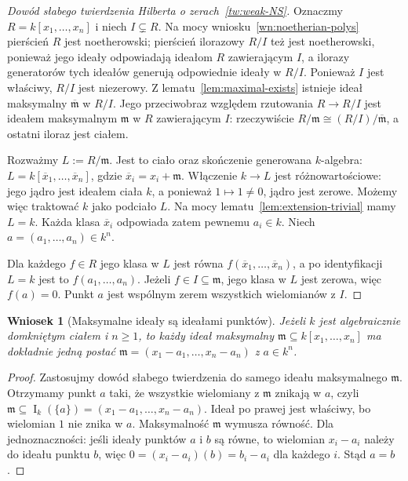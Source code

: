 \documentclass[11pt,a4paper,openany]{report}
\numberwithin{equation}{section}
\theoremstyle{plain}
\newtheorem{wniosek}[twierdzenie]{Wniosek}
\theoremstyle{definition}
\theoremstyle{remark}
\newcommand{\I}{\operatorname I}
\begin{document}
\begin{proof}[Dowód słabego twierdzenia Hilberta o zerach~\ref{tw:weak-NS}]
Oznaczmy $R=k[x_1,\dots,x_n]$ i niech $I\subsetneq R$.
Na mocy wniosku~\ref{wn:noetherian-polys} pierścień $R$
jest noetherowski; pierścień ilorazowy $R/I$ też jest
noetherowski, ponieważ jego ideały odpowiadają ideałom $R$
zawierającym $I$, a ilorazy generatorów tych ideałów generują
odpowiednie ideały w $R/I$.
Ponieważ $I$ jest właściwy, $R/I$ jest niezerowy.
Z lematu~\ref{lem:maximal-exists} istnieje ideał maksymalny
$\overline{\mathfrak m}$ w $R/I$.
Jego przeciwobraz względem rzutowania $R\to R/I$
jest ideałem maksymalnym $\mathfrak m$ w $R$ zawierającym $I$:
rzeczywiście $R/\mathfrak m\cong(R/I)/\overline{\mathfrak m}$,
a ostatni iloraz jest ciałem.

Rozważmy $L:=R/\mathfrak m$.
Jest to ciało oraz skończenie generowana $k$-algebra:
$L=k[\overline x_1,\dots,\overline x_n]$,
gdzie $\overline x_i=x_i+\mathfrak m$.
Włączenie $k\to L$ jest różnowartościowe: jego jądro jest
ideałem ciała $k$, a ponieważ $1\mapsto1\ne0$,
jądro jest zerowe. Możemy więc traktować $k$ jako podciało $L$.
Na mocy lematu~\ref{lem:extension-trivial} mamy $L=k$.
Każda klasa $\overline x_i$ odpowiada zatem pewnemu
$a_i\in k$. Niech $a=(a_1,\dots,a_n)\in k^n$.

Dla każdego $f\in R$ jego klasa w $L$ jest równa
$f(\overline x_1,\dots,\overline x_n)$, a po identyfikacji
$L=k$ jest to $f(a_1,\dots,a_n)$.
Jeżeli $f\in I\subseteq\mathfrak m$, jego klasa w $L$
jest zerowa, więc $f(a)=0$.
Punkt $a$ jest wspólnym zerem wszystkich wielomianów z $I$.
\end{proof}

\begin{wniosek}[Maksymalne ideały są ideałami punktów]
\label{wn:maximal-point}
Jeżeli $k$ jest algebraicznie domkniętym ciałem i $n\ge1$,
to każdy ideał maksymalny $\mathfrak m\subseteq k[x_1,\dots,x_n]$
ma dokładnie jedną postać
$\mathfrak m=(x_1-a_1,\dots,x_n-a_n)$ z $a\in k^n$.
\end{wniosek}
\begin{proof}
Zastosujmy dowód słabego twierdzenia do samego ideału
maksymalnego $\mathfrak m$.
Otrzymamy punkt $a$ taki, że wszystkie wielomiany z
$\mathfrak m$ znikają w $a$, czyli
$\mathfrak m\subseteq\I_k(\{a\})=(x_1-a_1,\dots,x_n-a_n)$.
Ideał po prawej jest właściwy, bo wielomian $1$ nie znika w $a$.
Maksymalność $\mathfrak m$ wymusza równość.
Dla jednoznaczności: jeśli ideały punktów $a$ i $b$ są równe,
to wielomian $x_i-a_i$ należy do ideału punktu $b$,
więc $0=(x_i-a_i)(b)=b_i-a_i$ dla każdego $i$.
Stąd $a=b$.
\end{proof}
\end{document}
